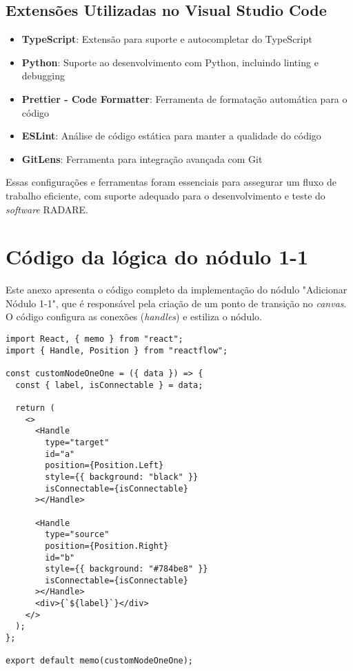 \section{Extensões Utilizadas no Visual Studio Code}
\begin{itemize}
    \item \textbf{TypeScript}: Extensão para suporte e autocompletar do TypeScript
    \item \textbf{Python}: Suporte ao desenvolvimento com Python, incluindo linting e debugging
    \item \textbf{Prettier - Code Formatter}: Ferramenta de formatação automática para o código
    \item \textbf{ESLint}: Análise de código estática para manter a qualidade do código
    \item \textbf{GitLens}: Ferramenta para integração avançada com Git
\end{itemize}

Essas configurações e ferramentas foram essenciais para assegurar um fluxo de trabalho eficiente, com suporte adequado para o desenvolvimento e teste do \textit{software} RADARE.

\chapter{Código da lógica do nódulo 1-1}
\label{Anexo:frontCodeNodeOneOne}

Este anexo apresenta o código completo da implementação do nódulo "Adicionar Nódulo 1-1", que é responsável pela criação de um ponto de transição no \textit{canvas}. O código configura as conexões (\textit{handles}) e estiliza o nódulo.

\begin{verbatim}
import React, { memo } from "react";
import { Handle, Position } from "reactflow";

const customNodeOneOne = ({ data }) => {
  const { label, isConnectable } = data;

  return (
    <>
      <Handle
        type="target"
        id="a"
        position={Position.Left}
        style={{ background: "black" }}
        isConnectable={isConnectable}
      ></Handle>

      <Handle
        type="source"
        position={Position.Right}
        id="b"
        style={{ background: "#784be8" }}
        isConnectable={isConnectable}
      ></Handle>
      <div>{`${label}`}</div>
    </>
  );
};

export default memo(customNodeOneOne);
\end{verbatim}


